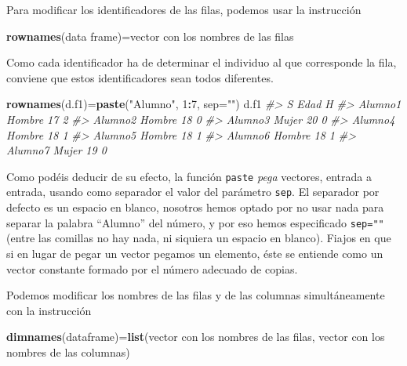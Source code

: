 \documentclass[
]{book}
\newenvironment{Shaded}{\begin{snugshade}}{\end{snugshade}}
\newcommand{\CommentTok}[1]{\textcolor[rgb]{0.56,0.35,0.01}{\textit{#1}}}
\newcommand{\DataTypeTok}[1]{\textcolor[rgb]{0.13,0.29,0.53}{#1}}
\newcommand{\DecValTok}[1]{\textcolor[rgb]{0.00,0.00,0.81}{#1}}
\newcommand{\KeywordTok}[1]{\textcolor[rgb]{0.13,0.29,0.53}{\textbf{#1}}}
\newcommand{\NormalTok}[1]{#1}
\newcommand{\OperatorTok}[1]{\textcolor[rgb]{0.81,0.36,0.00}{\textbf{#1}}}
\newcommand{\StringTok}[1]{\textcolor[rgb]{0.31,0.60,0.02}{#1}}
\theoremstyle{definition}
\theoremstyle{definition}
\theoremstyle{definition}
\theoremstyle{remark}
\begin{document}
Para modificar los identificadores de las filas, podemos usar la instrucción

\begin{Shaded}
\begin{Highlighting}[]
\KeywordTok{rownames}\NormalTok{(data frame)=vector con los nombres de las filas}
\end{Highlighting}
\end{Shaded}

Como cada identificador ha de determinar el individuo al que corresponde la fila, conviene que estos identificadores sean todos diferentes.

\begin{Shaded}
\begin{Highlighting}[]
\KeywordTok{rownames}\NormalTok{(d.f1)=}\KeywordTok{paste}\NormalTok{(}\StringTok{"Alumno"}\NormalTok{, }\DecValTok{1}\OperatorTok{:}\DecValTok{7}\NormalTok{, }\DataTypeTok{sep=}\StringTok{""}\NormalTok{)}
\NormalTok{d.f1}
\CommentTok{\#\textgreater{}              S Edad H}
\CommentTok{\#\textgreater{} Alumno1 Hombre   17 2}
\CommentTok{\#\textgreater{} Alumno2 Hombre   18 0}
\CommentTok{\#\textgreater{} Alumno3  Mujer   20 0}
\CommentTok{\#\textgreater{} Alumno4 Hombre   18 1}
\CommentTok{\#\textgreater{} Alumno5 Hombre   18 1}
\CommentTok{\#\textgreater{} Alumno6 Hombre   18 1}
\CommentTok{\#\textgreater{} Alumno7  Mujer   19 0}
\end{Highlighting}
\end{Shaded}

Como podéis deducir de su efecto, la función \texttt{paste} \emph{pega} vectores, entrada a entrada, usando como separador el valor del parámetro \texttt{sep}. El separador por defecto es un espacio en blanco, nosotros hemos optado por no usar nada para separar la palabra ``Alumno'' del número, y por eso hemos especificado \texttt{sep=""} (entre las comillas no hay nada, ni siquiera un espacio en blanco). Fiajos en que si en lugar de pegar un vector pegamos un elemento, éste se entiende como un vector constante formado por el número adecuado de copias.

Podemos modificar los nombres de las filas y de las columnas simultáneamente con la instrucción

\begin{Shaded}
\begin{Highlighting}[]
\KeywordTok{dimnames}\NormalTok{(dataframe)=}\KeywordTok{list}\NormalTok{(vector con los nombres de las filas, vector con los nombres de las columnas)}
\end{Highlighting}
\end{Shaded}
\end{document}
